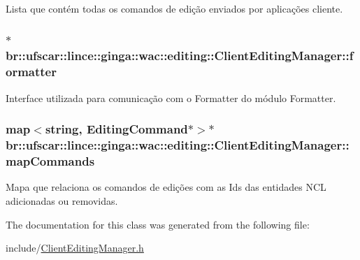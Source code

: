 Lista que contém todas os comandos de edição enviados por aplicações cliente. 

\hypertarget{classbr_1_1ufscar_1_1lince_1_1ginga_1_1wac_1_1editing_1_1ClientEditingManager_a49d8d70cee155e1d15c5da2cbb107777}{
\subsubsection[{formatter}]{$\ast$ {\bf br::ufscar::lince::ginga::wac::editing::ClientEditingManager::formatter}}}
\label{classbr_1_1ufscar_1_1lince_1_1ginga_1_1wac_1_1editing_1_1ClientEditingManager_a49d8d70cee155e1d15c5da2cbb107777}


Interface utilizada para comunicação com o Formatter do módulo Formatter. 

\hypertarget{classbr_1_1ufscar_1_1lince_1_1ginga_1_1wac_1_1editing_1_1ClientEditingManager_a01857fae3b654789d6a6eb665bf9e058}{
\subsubsection[{mapCommands}]{\setlength{\rightskip}{0pt plus 5cm}map$<$string, {\bf EditingCommand}$\ast$$>$$\ast$ {\bf br::ufscar::lince::ginga::wac::editing::ClientEditingManager::mapCommands}}}
\label{classbr_1_1ufscar_1_1lince_1_1ginga_1_1wac_1_1editing_1_1ClientEditingManager_a01857fae3b654789d6a6eb665bf9e058}


Mapa que relaciona os comandos de edições com as Ids das entidades NCL adicionadas ou removidas. 



The documentation for this class was generated from the following file:\begin{DoxyCompactItemize}
\item 
include/\hyperlink{ClientEditingManager_8h}{ClientEditingManager.h}\end{DoxyCompactItemize}
